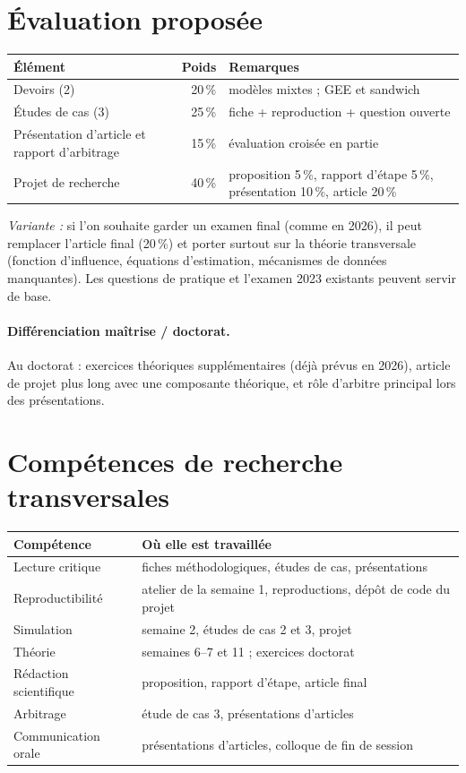 \documentclass[11pt]{article}
\begin{document}
\section{Évaluation proposée}

\begin{center}
\begin{tabularx}{\linewidth}{@{}Y r Y@{}}
\toprule
\textbf{Élément} & \textbf{Poids} & \textbf{Remarques}\\
\midrule
Devoirs (2) & 20\,\% & modèles mixtes ; GEE et sandwich\\
Études de cas (3) & 25\,\% & fiche + reproduction + question ouverte\\
Présentation d'article et rapport d'arbitrage & 15\,\% & évaluation croisée en partie\\
Projet de recherche & 40\,\% & proposition 5\,\%, rapport d'étape 5\,\%, présentation 10\,\%, article 20\,\%\\
\bottomrule
\end{tabularx}
\end{center}

\noindent\emph{Variante :} si l'on souhaite garder un examen final (comme en 2026), il peut
remplacer l'article final (20\,\%) et porter surtout sur la théorie transversale (fonction
d'influence, équations d'estimation, mécanismes de données manquantes). Les questions de pratique
et l'examen 2023 existants peuvent servir de base.

\paragraph{Différenciation maîtrise / doctorat.}
Au doctorat : exercices théoriques supplémentaires (déjà prévus en 2026), article de projet plus
long avec une composante théorique, et rôle d'arbitre principal lors des présentations.

\section{Compétences de recherche transversales}

\begin{center}
\begin{tabularx}{\linewidth}{@{}L{4.2cm} Y@{}}
\toprule
\textbf{Compétence} & \textbf{Où elle est travaillée}\\
\midrule
Lecture critique & fiches méthodologiques, études de cas, présentations\\
Reproductibilité & atelier de la semaine 1, reproductions, dépôt de code du projet\\
Simulation & semaine 2, études de cas 2 et 3, projet\\
Théorie & semaines 6--7 et 11 ; exercices doctorat\\
Rédaction scientifique & proposition, rapport d'étape, article final\\
Arbitrage & étude de cas 3, présentations d'articles\\
Communication orale & présentations d'articles, colloque de fin de session\\
\bottomrule
\end{tabularx}
\end{center}
\end{document}
